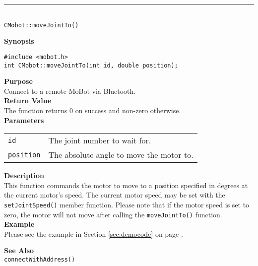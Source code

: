 \noindent
\vspace{5pt}
\rule{4.5in}{0.015in}\\
\noindent
{\LARGE \texttt{CMobot::moveJointTo()}}\\
{}

\noindent
{\bf Synopsis}\\
\begin{verbatim}
#include <mobot.h>
int CMobot::moveJointTo(int id, double position);
\end{verbatim}

\noindent
{\bf Purpose}\\
Connect to a remote MoBot via Bluetooth.\\

\noindent
{\bf Return Value}\\
The function returns 0 on success and non-zero otherwise.\\

\noindent
{\bf Parameters}\\
\vspace{-0.1in}
\begin{description}
\item               
\begin{tabular}{p{10 mm}p{145 mm}}
\texttt{id} & The joint number to wait for. \\
\texttt{position} & The absolute angle to move the motor to.  \\
\end{tabular}
\end{description}

\noindent
{\bf Description}\\
This function commands the motor to move to a position specified in degrees at
the current motor's speed. The current motor speed may be set with the
\texttt{setJointSpeed()} member function. Please note that if the motor speed
is set to zero, the motor will not move after calling the
\texttt{moveJointTo()} function. \\

\noindent
{\bf Example}\\
Please see the example in Section \ref{sec:democode} on page \pageref{sec:democode}.\\
\noindent

\noindent
{\bf See Also}\\
\texttt{connectWithAddress()}

